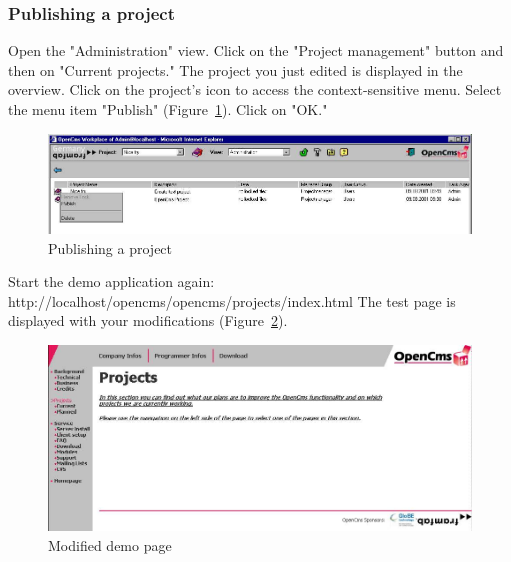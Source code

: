 \subsubsection{Publishing a project}

Open the "Administration" view. Click on the "Project management"
button and then on "Current projects." The project you just edited
is displayed in the overview. Click on the project's icon to
access the context-sensitive menu. Select the menu item "Publish"
(Figure~\ref{publishproject}). Click on "OK."

\begin{figure}[hbt]
\begin{center}
\includegraphics[width=\sgw]
                   {pics/usermanual/publishProject01}
\caption[Publishing a project]
           {Publishing a project}
\label{publishproject}
\end{center}
\end{figure}

Start the demo application again:\\
http://localhost/opencms/opencms/projects/index.html The test page
is displayed with your modifications (Figure~\ref{demopage02}).

\begin{figure}[hbt]
\begin{center}
\includegraphics[width=\sgw]
                   {pics/usermanual/demoPage02}
\caption[Modified demo page]
           {Modified demo page}
\label{demopage02}
\end{center}
\end{figure}


